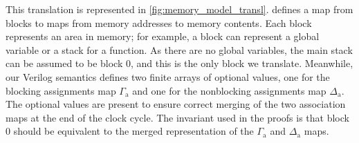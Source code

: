 This translation is represented in \cref{fig:memory_model_transl}.  \compcert{} defines a map from blocks to maps from memory addresses to memory contents.  Each block represents an area in memory; for example, a block can represent a global variable or a stack for a function. As there are no global variables, the main stack can be assumed to be block 0, and this is the only block we translate.
Meanwhile, our Verilog semantics defines two finite arrays of optional values, one for the blocking assignments map $\Gamma_{\mathrm{a}}$ and one for the nonblocking assignments map $\Delta_{\mathrm{a}}$.
The optional values are present to ensure correct merging of the two association maps at the end of the clock cycle. %
The invariant used in the proofs is that block 0 should be equivalent to the merged representation of the $\Gamma_{\mathrm{a}}$ and $\Delta_{\mathrm{a}}$ maps.


